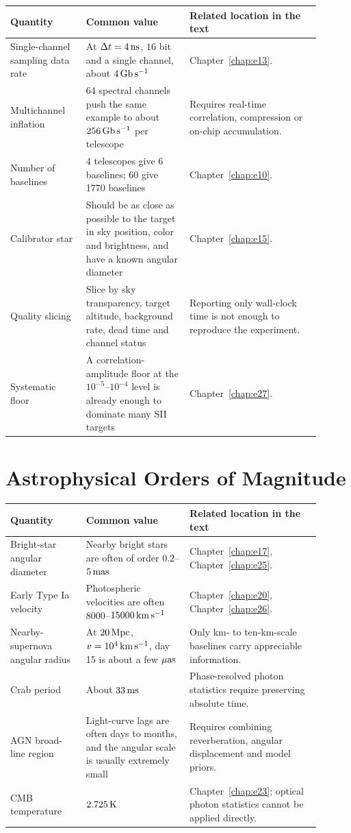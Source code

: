 \begin{longtable}{p{0.22\linewidth}p{0.30\linewidth}p{0.38\linewidth}}
\toprule
Quantity & Common value & Related location in the text \\
\midrule
Single-channel sampling data rate & At \(\Delta t=4\,{\rm ns}\), \(16\) bit and a single channel, about \(4\,{\rm Gb\,s^{-1}}\) & Chapter~\ref{chap:e13}. \\
Multichannel inflation & 64 spectral channels push the same example to about \(256\,{\rm Gb\,s^{-1}}\) per telescope & Requires real-time correlation, compression or on-chip accumulation. \\
Number of baselines & 4 telescopes give 6 baselines; 60 give 1770 baselines & Chapter~\ref{chap:e10}. \\
Calibrator star & Should be as close as possible to the target in sky position, color and brightness, and have a known angular diameter & Chapter~\ref{chap:e15}. \\
Quality slicing & Slice by sky transparency, target altitude, background rate, dead time and channel status & Reporting only wall-clock time is not enough to reproduce the experiment. \\
Systematic floor & A correlation-amplitude floor at the \(10^{-5}\)--\(10^{-4}\) level is already enough to dominate many SII targets & Chapter~\ref{chap:e27}. \\
\bottomrule
\end{longtable}

\section{Astrophysical Orders of Magnitude}
\label{appsec:b-astro}

\begin{longtable}{p{0.22\linewidth}p{0.30\linewidth}p{0.38\linewidth}}
\toprule
Quantity & Common value & Related location in the text \\
\midrule
Bright-star angular diameter & Nearby bright stars are often of order \(0.2\)--\(5\,{\rm mas}\) & Chapter~\ref{chap:e17}, Chapter~\ref{chap:e25}. \\
Early Type Ia velocity & Photospheric velocities are often \(8000\)--\(15000\,{\rm km\,s^{-1}}\) & Chapter~\ref{chap:e20}, Chapter~\ref{chap:e26}. \\
Nearby-supernova angular radius & At \(20\,{\rm Mpc}\), \(v=10^4\,{\rm km\,s^{-1}}\), day 15 is about a few \(\mu{\rm as}\) & Only km- to ten-km-scale baselines carry appreciable information. \\
Crab period & About \(33\,{\rm ms}\) & Phase-resolved photon statistics require preserving absolute time. \\
AGN broad-line region & Light-curve lags are often days to months, and the angular scale is usually extremely small & Requires combining reverberation, angular displacement and model priors. \\
CMB temperature & \(2.725\,{\rm K}\) & Chapter~\ref{chap:e23}; optical photon statistics cannot be applied directly. \\
\bottomrule
\end{longtable}
